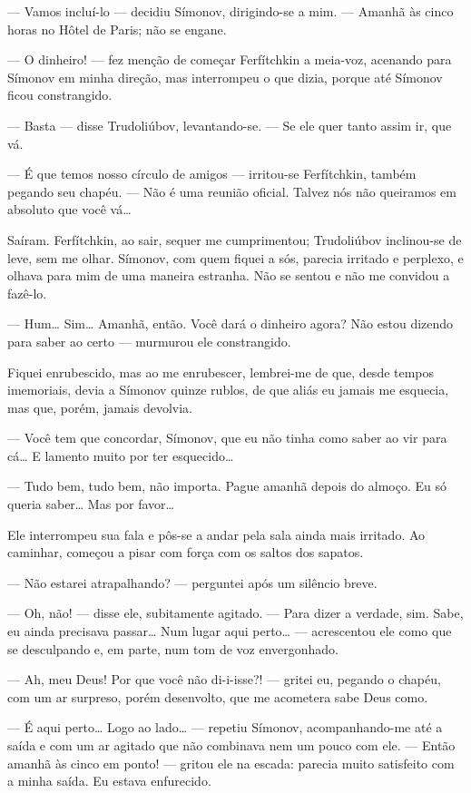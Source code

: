 --- Vamos incluí-lo --- decidiu Símonov, dirigindo-se a mim. --- Amanhã às
cinco horas no Hôtel de Paris; não se engane.

--- O dinheiro! --- fez menção de começar Ferfítchkin a meia-voz, acenando
para Símonov em minha direção, mas interrompeu o que dizia, porque até
Símonov ficou constrangido.

--- Basta --- disse Trudoliúbov, levantando-se. --- Se ele quer tanto assim
ir, que vá.

--- É que temos nosso círculo de amigos --- irritou-se Ferfítchkin, também
pegando seu chapéu. --- Não é uma reunião oficial. Talvez nós não
queiramos em absoluto que você vá\ldots{}

Saíram. Ferfítchkin, ao sair, sequer me cumprimentou; Trudoliúbov
inclinou-se de leve, sem me olhar. Símonov, com quem fiquei a sós,
parecia irritado e perplexo, e olhava para mim de uma maneira estranha.
Não se sentou e não me convidou a fazê-lo.

--- Hum\ldots{} Sim\ldots{} Amanhã, então. Você dará o dinheiro agora? Não estou
dizendo para saber ao certo --- murmurou ele constrangido.

Fiquei enrubescido, mas ao me enrubescer, lembrei-me de que, desde
tempos imemoriais, devia a Símonov quinze rublos, de que aliás eu
jamais me esquecia, mas que, porém, jamais devolvia.

--- Você tem que concordar, Símonov, que eu não tinha como saber ao vir
para cá\ldots{} E lamento muito por ter esquecido\ldots{}

--- Tudo bem, tudo bem, não importa. Pague amanhã depois do almoço. Eu só
queria saber\ldots{} Mas por favor\ldots{}

Ele interrompeu sua fala e pôs-se a andar pela sala ainda mais irritado.
Ao caminhar, começou a pisar com força com os saltos dos sapatos.

--- Não estarei atrapalhando? --- perguntei após um silêncio breve.

--- Oh, não! --- disse ele, subitamente agitado. --- Para dizer a verdade,
sim. Sabe, eu ainda precisava passar\ldots{} Num lugar aqui perto\ldots{} ---
acrescentou ele como que se desculpando e, em parte, num tom de voz
envergonhado.

--- Ah, meu Deus! Por que você não di-i-isse?! --- gritei eu, pegando o
chapéu, com um ar surpreso, porém desenvolto, que me acometera sabe Deus
como.

--- É aqui perto\ldots{} Logo ao lado\ldots{} --- repetiu Símonov, acompanhando-me até
a saída e com um ar agitado que não combinava nem um pouco com ele. ---
Então amanhã às cinco em ponto! --- gritou ele na escada: parecia muito
satisfeito com a minha saída. Eu estava enfurecido.

